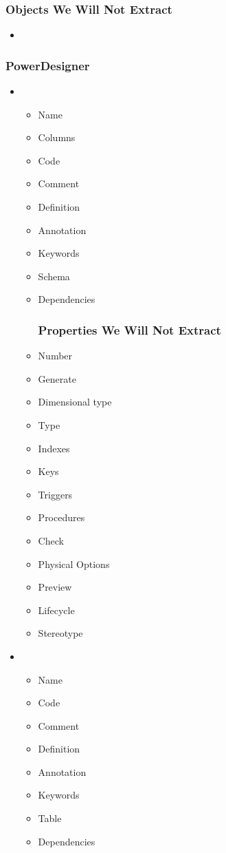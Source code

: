 \documentclass[12pt,a4paper]{report}
\begin{document}
\begin{itemize}
	\subsubsection{Objects We Will Not Extract}
	\begin{itemize}
		\item {}
	\end{itemize}
\end{itemize}

\subsubsection{PowerDesigner}

\begin{itemize}
	\item {}
	\begin{itemize}
		\item Name 
		\item Columns
		\item Code 
		\item Comment
		\item Definition
		\item Annotation
		\item Keywords
		\item Schema
		\item Dependencies
		\subsubsection{Properties We Will Not Extract}
		\item Number
		\item Generate
		\item Dimensional type
		\item Type
		\item Indexes
		\item Keys 
		\item Triggers
		\item Procedures
		\item Check 
		\item Physical Options
		\item Preview
		\item Lifecycle 
		\item Stereotype
	\end{itemize}
	\item {}
	\begin{itemize}
		\item Name 
		\item Code 
		\item Comment
		\item Definition
		\item Annotation
		\item Keywords
		\item Table
		\item Dependencies

\end{itemize}
\end{itemize}
\end{document}
